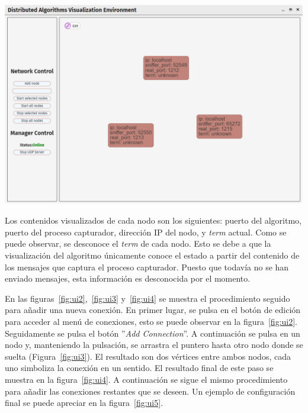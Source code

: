 
{
\centering
\includegraphics[width=0.9\linewidth]{imagenes/ui1}
\label{fig:ui1}
}

Los contenidos visualizados de cada nodo son los siguientes: puerto del algoritmo, puerto del proceso capturador, dirección IP del nodo, y \textit{term} actual. Como se puede observar, se desconoce el \textit{term} de cada nodo. Esto se debe a que la visualización del algoritmo únicamente conoce el estado a partir del contenido de los mensajes que captura el proceso capturador. Puesto que todavía no se han enviado mensajes, esta información es desconocida por el momento.

En las figuras~\ref{fig:ui2},~\ref{fig:ui3} y~\ref{fig:ui4} se muestra el procedimiento seguido para añadir una nueva conexión. En primer lugar, se pulsa en el botón de edición para acceder al menú de conexiones, esto se puede observar en la figura~\ref{fig:ui2}. Seguidamente se pulsa el botón ''\textit{Add Connection}''. A continuación se pulsa en un nodo y, manteniendo la pulsación, se arrastra el puntero hasta otro nodo donde se suelta (Figura~\ref{fig:ui3}). El resultado son dos vértices entre ambos nodos, cada uno simboliza la conexión en un sentido. El resultado final de este paso se muestra en la figura~\ref{fig:ui4}. A continuación se sigue el mismo procedimiento para añadir las conexiones restantes que se deseen. Un ejemplo de configuración final se puede apreciar en la figura~\ref{fig:ui5}.

